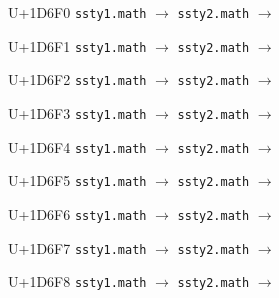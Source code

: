 \documentclass{article}
\begin{document}
\begin{substitutions}
\goodbreak

U+1D6F0  \linebreak
    \texttt{ssty1.math} $\to$  \linebreak
    \texttt{ssty2.math} $\to$  

\goodbreak

U+1D6F1  \linebreak
    \texttt{ssty1.math} $\to$  \linebreak
    \texttt{ssty2.math} $\to$  

\goodbreak

U+1D6F2  \linebreak
    \texttt{ssty1.math} $\to$  \linebreak
    \texttt{ssty2.math} $\to$  

\goodbreak

U+1D6F3  \linebreak
    \texttt{ssty1.math} $\to$  \linebreak
    \texttt{ssty2.math} $\to$  

\goodbreak

U+1D6F4  \linebreak
    \texttt{ssty1.math} $\to$  \linebreak
    \texttt{ssty2.math} $\to$  

\goodbreak

U+1D6F5  \linebreak
    \texttt{ssty1.math} $\to$  \linebreak
    \texttt{ssty2.math} $\to$  

\goodbreak

U+1D6F6  \linebreak
    \texttt{ssty1.math} $\to$  \linebreak
    \texttt{ssty2.math} $\to$  

\goodbreak

U+1D6F7  \linebreak
    \texttt{ssty1.math} $\to$  \linebreak
    \texttt{ssty2.math} $\to$  

\goodbreak

U+1D6F8  \linebreak
    \texttt{ssty1.math} $\to$  \linebreak
    \texttt{ssty2.math} $\to$  


\end{substitutions}
\end{document}
